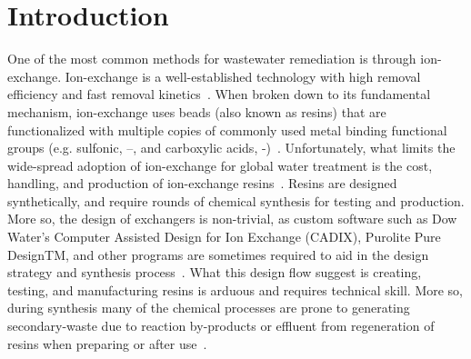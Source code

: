 \documentclass[../main/main]{subfiles}
\begin{document}
\section{Introduction}
One of the most common methods for wastewater remediation is through ion-exchange. Ion-exchange is a well-established technology with high removal efficiency and fast removal kinetics~\cite{fu2011removal,ustun2007regeneration,motsi2009adsorption,kumargupta2012}.
When broken down to its fundamental mechanism, ion-exchange uses beads (also known as resins) that are functionalized with multiple copies of commonly used metal binding functional groups (e.g. sulfonic, --, and carboxylic acids, -)~\cite{fu2011removal}.
Unfortunately, what limits the wide-spread adoption of ion-exchange for global water treatment is the cost, handling, and production of ion-exchange resins~\cite{ustun2007regeneration,amini2015}. Resins are designed synthetically, and require rounds of chemical synthesis for testing and production.
More so, the design of exchangers is non-trivial, as custom software such as Dow Water's Computer Assisted Design for Ion Exchange (CADIX), Purolite Pure DesignTM, and other programs are sometimes required to aid in the design strategy and synthesis process~\cite{wachinski2016}. What this design flow suggest is creating, testing, and manufacturing resins is arduous and requires technical skill. More so, during synthesis many of the chemical processes are prone to generating secondary-waste due to reaction by-products or effluent from regeneration of resins when preparing or after use~\cite{kumargupta2012,amini2015}.
\end{document}
